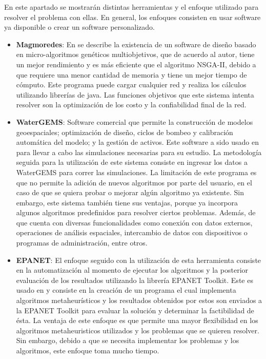 \documentclass[11pt,letterpaper]{article}
\begin{document}
En este apartado se mostrarán distintas herramientas y el enfoque utilizado para resolver el problema con ellas. En general, los enfoques consisten en usar software ya disponible o crear un software personalizado.

\begin{itemize}
	\item \textbf{Magmoredes}: En \cite{Edwin2017} se describe la existencia de un software de diseño basado en micro-algoritmos genéticos multiobjetivos, que de acuerdo al autor, tiene un mejor rendimiento y es más eficiente que el algoritmo NSGA-II, debido a que requiere una menor cantidad de memoria y tiene un mejor tiempo de cómputo. Este programa puede cargar cualquier red y realiza los cálculos utilizando librerías de java. Las funciones objetivos que este sistema intenta resolver son la optimización de los costo y la confiabilidad final de la red.
	
	\item \textbf{WaterGEMS}: Software comercial que permite la construcción de modelos geoespaciales; optimización de diseño, ciclos de bombeo y calibración automática del modelo; y la gestión de activos. Este software a sido usado en \cite{Mehta2017} para llevar a cabo las simulaciones necesarias para su estudio. La metodología seguida para la utilización de este sistema consiste en ingresar los datos a WaterGEMS para correr las simulaciones. La limitación de este programa es que no permite la adición de nuevos algoritmos por parte del usuario, en el caso de que se quiera probar o mejorar algún algoritmo ya existente. Sin embargo, este sistema también tiene sus ventajas, porque ya incorpora algunos algoritmos predefinidos para resolver ciertos problemas. Además, de que cuenta con diversas funcionalidades como conexión con datos externos, operaciones de análisis espaciales, intercambio de datos con dispositivos o programas de administración, entre otros.
	
	\item \textbf{EPANET}: El enfoque seguido con la utilización de esta herramienta consiste en la automatización al momento de ejecutar los algoritmos y la posterior evaluación de los resultados utilizando la librería EPANET Toolkit. Este es usado en \cite{Doctoral2012} y consiste en la creación de un programa el cual implementa algoritmos metaheurísticos y los resultados obtenidos por estos son enviados a la EPANET Toolkit para evaluar la solución y determinar la factibilidad de ésta. La ventaja de este enfoque es que permite una mayor flexibilidad en los algoritmos metaheuristicos utilizados y los problemas que se quieren resolver. Sin embargo, debido a que se necesita implementar los problemas y los algoritmos, este enfoque toma mucho tiempo.
\end{itemize}
\end{document}
